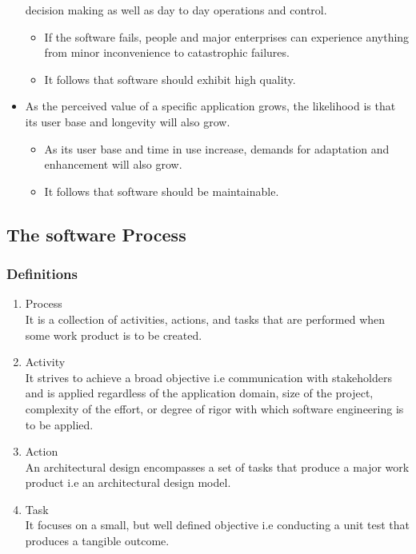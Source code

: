 \documentclass{article}
\begin{document}
\begin{itemize}
			decision making as well as day to day operations and control.
			\begin{itemize}
				\item If the software fails, people and major enterprises can experience anything from minor
					inconvenience to catastrophic failures.
				\item It follows that software should exhibit high quality.
			\end{itemize}
		\item As the perceived value of a specific application grows, the likelihood is that its user base and
			longevity will also grow.
			\begin{itemize}
				\item As its user base and time in use increase, demands for adaptation and enhancement will
					also grow.
				\item It follows that software should be maintainable.
			\end{itemize}
	\end{itemize}

	\subsection{The software Process}
	\subsubsection{Definitions}
	\begin{enumerate}
		\item Process \\
			It is a collection of activities, actions, and tasks that are performed when some work product is to
				be created.
		\item Activity \\
			It strives to achieve a broad objective i.e communication with stakeholders and is applied
				regardless of the application domain, size of the project, complexity of the effort, or degree
				of rigor with which software engineering is to be applied.
		\item Action \\
			An architectural design encompasses a set of tasks that produce a major work product i.e an
				architectural design model.
		\item Task \\
			It focuses on a small, but well defined objective i.e conducting a unit test that produces a
				tangible outcome.
	\end{enumerate} \newpage
\end{document}
